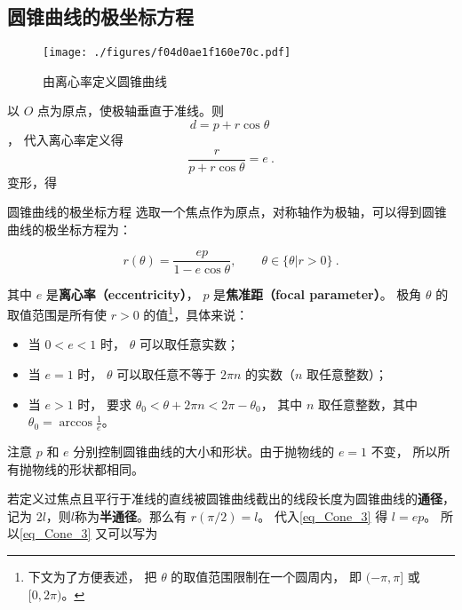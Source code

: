 

\subsection{圆锥曲线的极坐标方程}

\begin{figure}[ht]
\centering
\texttt{[image: ./figures/f04d0ae1f160e70c.pdf]}
\caption{由离心率定义圆锥曲线}\label{fig_Cone_1}
\end{figure}

以 $O$ 点为原点，使极轴垂直于准线。则 $$d = p + r \cos \theta ~$$， 代入离心率定义得
\begin{equation}\label{eq_Cone_2}
\frac{r}{p + r \cos \theta } = e~.
\end{equation}
变形，得
\begin{definition}{圆锥曲线的极坐标方程}
选取一个焦点作为原点，对称轴作为极轴，可以得到圆锥曲线的极坐标方程为：

\begin{equation}\label{eq_Cone_3}
r(\theta) = \frac{ep}{1 - e\cos \theta },\qquad\theta\in\{\theta|r>0\}~.
\end{equation}

其中 $e$ 是\textbf{离心率（eccentricity）}， $p$ 是\textbf{焦准距（focal parameter）}。 极角 $\theta$ 的取值范围是所有使 $r>0$ 的值\footnote{下文为了方便表述， 把 $\theta$ 的取值范围限制在一个圆周内， 即 $(-\pi,\pi]$ 或 $[0, 2\pi)$。}，具体来说：
\begin{itemize}
\item 当 $0 < e < 1$ 时，  $\theta$ 可以取任意实数；
\item 当 $e = 1$ 时， $\theta$ 可以取任意不等于 $2\pi n$ 的实数（$n$ 取任意整数）；
\item 当 $e > 1$ 时， 要求 $\theta_0< \theta + 2\pi n < 2\pi-\theta_0$， 其中 $n$ 取任意整数，其中$\displaystyle\theta_0 = \arccos\frac{1}{e}$。
\end{itemize}  
\end{definition}

注意 $p$ 和 $e$ 分别控制圆锥曲线的大小和形状。由于抛物线的 $e = 1$ 不变， 所以所有抛物线的形状都相同。

若定义过焦点且平行于准线的直线被圆锥曲线截出的线段长度为圆锥曲线的\textbf{通径}，记为 $2l$，则$l$称为\textbf{半通径}。那么有 $r(\pi /2) = l$。 代入\autoref{eq_Cone_3} 得 $l = ep$。 所以\autoref{eq_Cone_3} 又可以写为

